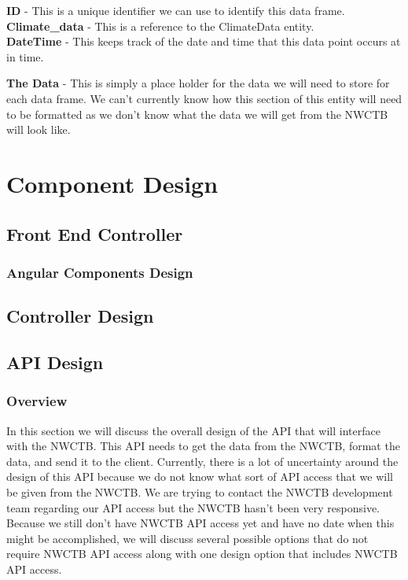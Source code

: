 \documentclass[onecolumn, draftclsnofoot,10pt, compsoc]{article}
\begin{document}
					\textbf{ID} - This is a unique identifier we can use to identify this data frame.\\
					
					\textbf{Climate\_data} - This is a reference to the ClimateData entity.\\
					
					\textbf{DateTime} - This keeps track of the date and time that this data point occurs at in time.
					
					\textbf{The Data} - This is simply a place holder for the data we will need to store for each data frame. We can't currently know how this section of this entity will need to be formatted as we don't know what the data we will get from the NWCTB will look like.\\
				
				
		
		
		
\section{Component Design}

	\subsection{Front End Controller}
	
		\subsubsection{Angular Components Design}
	

	\subsection{Controller Design}
	
	\subsection{API Design}
		\subsubsection{Overview}
			In this section we will discuss the overall design of the API that will interface with the NWCTB. This API needs to get the data from the NWCTB, format the data, and send it to the client. Currently, there is a lot of uncertainty around the design of this API because we do not know what sort of API access that we will be given from the NWCTB. We are trying to contact the NWCTB development team regarding our API access but the NWCTB hasn't been very responsive. Because we still don't have NWCTB API access yet and have no date when this might be accomplished, we will discuss several possible options that do not require NWCTB API access along with one design option that includes NWCTB API access.\\
			
\end{document}

